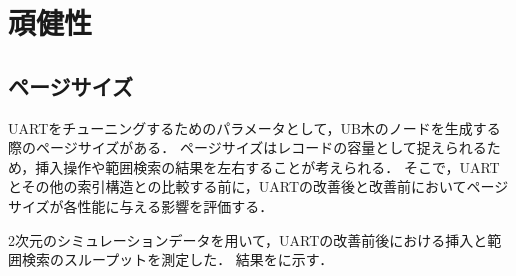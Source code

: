 \section{頑健性}
\subsection{ページサイズ}
UARTをチューニングするためのパラメータとして，UB木のノードを生成する際のページサイズがある．
ページサイズはレコードの容量として捉えられるため，挿入操作や範囲検索の結果を左右することが考えられる．
そこで，UARTとその他の索引構造との比較する前に，UARTの改善後と改善前においてページサイズが各性能に与える影響を評価する．

2次元のシミュレーションデータを用いて，UARTの改善前後における挿入と範囲検索のスループットを測定した．
結果を\Fig{\ref{graph:ps-in}}\Fig{\ref{graph:ps-sc}}に示す．
